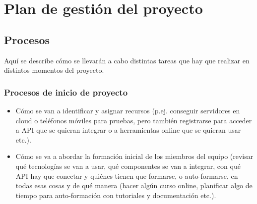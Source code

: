 
\chapter{Plan de gestión del proyecto} %

\label{Chapter3} %


\section{Procesos}

Aquí se describe cómo se llevarán a cabo distintas tareas que hay que realizar en distintos momentos del proyecto.

\subsection{Procesos de inicio de proyecto}

\begin{itemize}
	\item Cómo se van a identificar y asignar recursos (p.ej. conseguir servidores en cloud o teléfonos móviles para pruebas, pero también registrarse para acceder a API que se quieran integrar o a herramientas online que se quieran usar etc.).
	\item Cómo se va a abordar la formación inicial de los miembros del equipo (revisar qué tecnologías se van a usar, qué componentes se van a integrar, con qué API hay que conectar y quiénes tienen que formarse, o auto-formarse, en todas esas cosas y de qué manera (hacer algún curso online, planificar algo de tiempo para auto-formación con tutoriales y documentación etc.).
\end{itemize}

